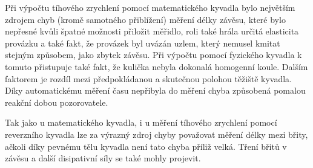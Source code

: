 \documentclass[protokol.tex]{subfiles}
\begin{document}
Při výpočtu tíhového zrychlení pomocí matematického kyvadla bylo největším zdrojem chyb (kromě samotného přiblížení) měření délky závěsu, které bylo nepřesné kvůli špatné možnosti přiložit měřidlo, roli také hrála určitá elasticita provázku a také fakt, že provázek byl uvázán uzlem, který nemusel kmitat stejným způsobem, jako zbytek závěsu. Při výpočtu pomocí fyzického kyvadla k tomuto přistupuje také fakt, že kulička nebyla dokonalá homogenní koule. Dalším faktorem je rozdíl mezi předpokládanou a skutečnou polohou těžiště kyvadla. Díky automatickému měření času nepřibyla do měření chyba způsobená pomalou reakční dobou pozorovatele. 

Tak jako u matematického kyvadla, i u měření tíhového zrychlení pomocí reverzního kyvadla lze za výrazný zdroj chyby považovat měření délky mezi břity, ačkoli díky pevnému tělu kyvadla není tato chyba příliž velká. Tření břitů v závěsu a další disipativní síly se také mohly projevit.
\end{document}
